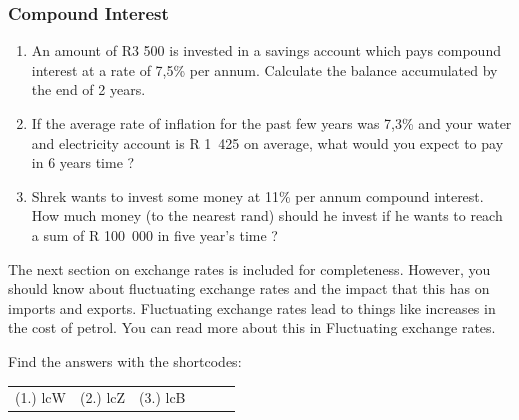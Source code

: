 \label{m39334*secfhsst!!!underscore!!!id3169}
            \subsubsection{ Compound Interest }
            \nopagebreak
            \label{m39334*id75300}\begin{enumerate}[noitemsep, label=\textbf{\arabic*}. ] 
            \label{m39334*uid74}\item An amount of R3 500 is invested in a savings account which pays compound interest at a rate of 7,5\% per annum. Calculate the balance accumulated by the end of 2 years.\newline
    
        
\label{m39334*uid75}\item If the average rate of inflation for the past few years was 7,3\% and your water and electricity account is R 1~425 on average, what would you expect to pay in 6 years time ?\newline
    
        
\label{m39334*uid76}\item Shrek wants to invest some money at 11\% per annum compound interest. How much money (to the nearest rand) should he invest if he wants to reach a sum of R 100~000 in five year's time ?\newline
    
        
\end{enumerate}
        
        

      
    
  \label{m39334*eip-523}The next section on exchange rates is included for completeness. However, you should know about fluctuating exchange rates and the impact that this has on imports and exports. Fluctuating exchange rates lead to things like increases in the cost of petrol. You can read more about this in Fluctuating exchange rates.\par 
  \label{m39334**end}
          
\par {} Find the answers with the shortcodes:
 \par \begin{tabular}[h]{cccccc}
 (1.) lcW  &  (2.) lcZ  &  (3.) lcB  & \end{tabular}




